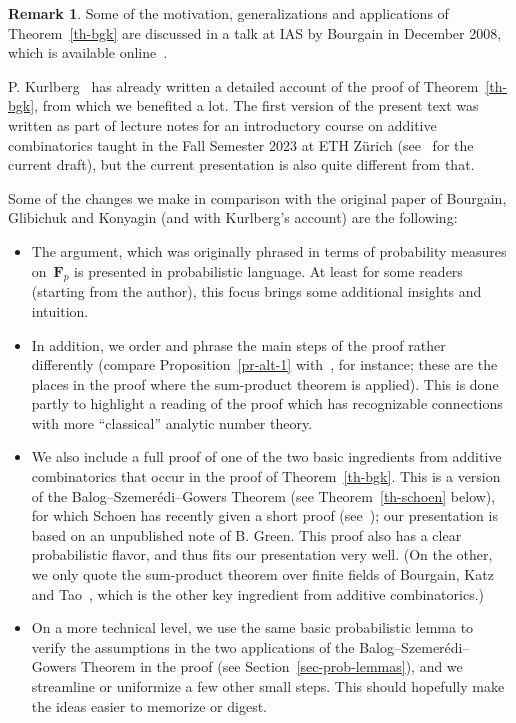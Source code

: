 \documentclass[12pt]{amsart}
\numberwithin{equation}{section}
\newcommand{\Ff}{\mathbf{F}}
\theoremstyle{plain}
\theoremstyle{remark}
\theoremstyle{definition}
\newtheorem{remark}[theorem]{Remark}
\begin{document}
\begin{remark}
  Some of the motivation, generalizations and applications of
  Theorem~\ref{th-bgk} are discussed in a talk at IAS by Bourgain in
  December 2008, which is available online~\cite{bourgain-talk}.
  
  P. Kurlberg~\cite{kurlberg} has already written a detailed account of
  the proof of Theorem~\ref{th-bgk}, from which we benefited a lot. The
  first version of the present text was written as part of lecture notes
  for an introductory course on additive combinatorics taught in the
  Fall Semester 2023 at ETH Zürich (see~\cite{add-comb} for the current
  draft), but the current presentation is also quite different from
  that.

  Some of the changes we make in comparison with the original paper of
  Bourgain, Glibichuk and Konyagin (and with Kurlberg's account) are the
  following:
  \begin{itemize}
  \item The argument, which was originally phrased in terms of
    probability measures on~$\Ff_p$ is presented in probabilistic
    language. At least for some readers (starting from the author), this
    focus brings some additional insights and intuition.
  \item In addition, we order and phrase the main steps of the proof
    rather differently (compare Proposition~\ref{pr-alt-1}
    with~\cite[Prop.\,3.1]{kurlberg}, for instance; these are the places
    in the proof where the sum-product theorem is applied). This is done
    partly to highlight a reading of the proof which has recognizable
    connections with more ``classical'' analytic number theory.
  \item We also include a full proof of one of the two basic ingredients
    from additive combinatorics that occur in the proof of
    Theorem~\ref{th-bgk}. This is a version of the
    Balog--Szemerédi--Gowers Theorem (see Theorem~\ref{th-schoen}
    below), for which Schoen has recently given a short proof
    (see~\cite{schoen}); our presentation is based on an unpublished
    note of B. Green. This proof also has a clear probabilistic flavor,
    and thus fits our presentation very well. (On the other, we only
    quote the sum-product theorem over finite fields of Bourgain, Katz
    and Tao~\cite{bkt}, which is the other key ingredient from additive
    combinatorics.)
  \item On a more technical level, we use the same basic probabilistic
    lemma to verify the assumptions in the two applications of the
    Balog--Szemerédi--Gowers Theorem in the proof (see
    Section~\ref{sec-prob-lemmas}), and we streamline or uniformize a
    few other small steps. This should hopefully make the ideas easier
    to memorize or digest.
  \end{itemize}
\end{remark}
\end{document}
